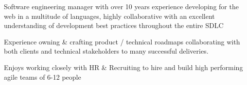 \documentclass[9pt]{developercv} %
\begin{document}
\vspace{0.5cm}



\begin{minipage}[t]{0.5\textwidth} %
	\vspace{-\baselineskip} %
Software engineering manager with over 10 years experience developing for the web in a multitude of languages, highly collaborative with an excellent understanding of development best practices throughout the entire SDLC

Experience owning \& crafting product / technical roadmaps collaborating with both clients and technical stakeholders to many successful deliveries.

Enjoys working closely with HR \& Recruiting to hire and build high performing agile teams of 6-12 people
\end{minipage}
\hfill %
\begin{minipage}[t]{0.4\textwidth} %
	\vspace{-\baselineskip} %
	\begin{barchart}{5.5}
	\end{barchart}
\end{minipage}



\end{document}
